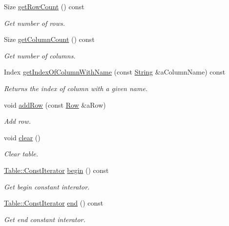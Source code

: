 \begin{DoxyCompactItemize}
Size \hyperlink{classlibrary_1_1core_1_1ctnr_1_1_table_a18036491993fea84dd2a595e7703258f}{get\+Row\+Count} () const
\begin{DoxyCompactList}\small\item\em Get number of rows. \end{DoxyCompactList}\item 
Size \hyperlink{classlibrary_1_1core_1_1ctnr_1_1_table_af725ea46d4737e1c3d0d8ad5a4dda733}{get\+Column\+Count} () const
\begin{DoxyCompactList}\small\item\em Get number of columns. \end{DoxyCompactList}\item 
Index \hyperlink{classlibrary_1_1core_1_1ctnr_1_1_table_a6144fd9e6f0e18bb17f457a32ab3c027}{get\+Index\+Of\+Column\+With\+Name} (const \hyperlink{classlibrary_1_1core_1_1types_1_1_string}{String} \&a\+Column\+Name) const
\begin{DoxyCompactList}\small\item\em Returns the index of column with a given name. \end{DoxyCompactList}\item 
void \hyperlink{classlibrary_1_1core_1_1ctnr_1_1_table_a9c9b8b7a2eca260d58b721c4f465a7d3}{add\+Row} (const \hyperlink{classlibrary_1_1core_1_1ctnr_1_1table_1_1_row}{Row} \&a\+Row)
\begin{DoxyCompactList}\small\item\em Add row. \end{DoxyCompactList}\item 
void \hyperlink{classlibrary_1_1core_1_1ctnr_1_1_table_a82b89b7d22f40518054f6d507660e8b5}{clear} ()
\begin{DoxyCompactList}\small\item\em Clear table. \end{DoxyCompactList}\item 
\hyperlink{classlibrary_1_1core_1_1ctnr_1_1_table_a7fa78ad4e7e8d27ceab0bff51ab84fc3}{Table\+::\+Const\+Iterator} \hyperlink{classlibrary_1_1core_1_1ctnr_1_1_table_ad9a420d9759797e8e8d9142da502a6c8}{begin} () const
\begin{DoxyCompactList}\small\item\em Get begin constant interator. \end{DoxyCompactList}\item 
\hyperlink{classlibrary_1_1core_1_1ctnr_1_1_table_a7fa78ad4e7e8d27ceab0bff51ab84fc3}{Table\+::\+Const\+Iterator} \hyperlink{classlibrary_1_1core_1_1ctnr_1_1_table_af1aadfb47df33ffa4f611f571d52bd89}{end} () const
\begin{DoxyCompactList}\small\item\em Get end constant interator. \end{DoxyCompactList}\end{DoxyCompactItemize}
